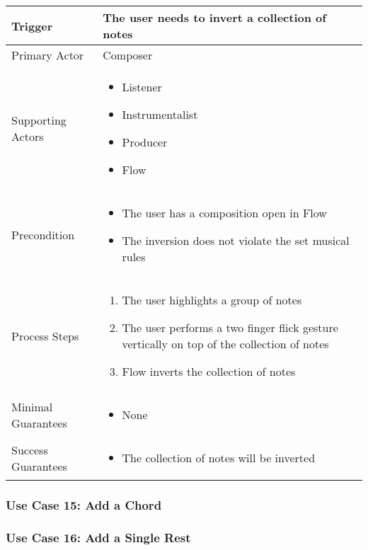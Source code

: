 \begin{tabularx}{\textwidth}{|X|X|}
\hline
Trigger & 
The user needs to invert a collection of notes \\
\hline
Primary Actor & 
Composer \\
\hline
Supporting Actors & 
\begin{itemize}
\item Listener
\item Instrumentalist
\item Producer
\item Flow
\end{itemize} \\
\hline
Precondition & 
\begin{itemize}
\item The user has a composition open in Flow
\item The inversion does not violate the set musical rules
\end{itemize} \\
\hline
Process Steps & 
\begin{enumerate}
\item The user highlights a group of notes
\item The user performs a two finger flick gesture vertically on top of the collection of notes
\item Flow inverts the collection of notes
\end{enumerate} \\
\hline
Minimal Guarantees & 
\begin{itemize}
  \item None
\end{itemize} \\
\hline
Success Guarantees & 
\begin{itemize}
  \item The collection of notes will be inverted
\end{itemize} \\
\hline
\end{tabularx}

\subsubsection{Use Case 15: Add a Chord}


\subsubsection{Use Case 16: Add a Single Rest}

